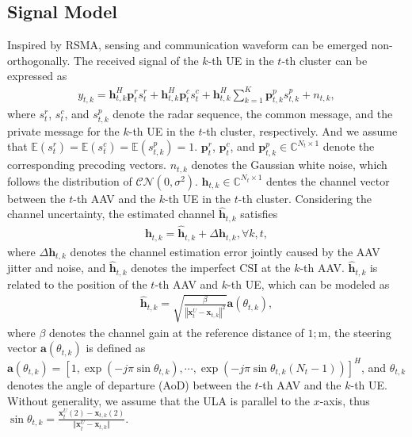 \documentclass[twocolumn,journal]{IEEEtran}
\begin{document}
\subsection{Signal Model}
Inspired by RSMA, sensing and communication waveform can be emerged non-orthogonally. The received signal of the \(k\)-th UE in the \(t\)-th cluster can be expressed as 
\begin{align}
    y_{t,k} = \boldsymbol{h}^{H}_{t,k}\boldsymbol{p}^{r}_{t} {s}^{r}_{t} + \boldsymbol{h}^{H}_{t,k}\boldsymbol{p}^{c}_{t}{s}^{c}_{t} + \boldsymbol{h}^{H}_{t,k}\sum_{k=1}^{K} \boldsymbol{p}^{p}_{t,k} {s}^{p}_{t,k} + n_{t,k},
\end{align}
where \(s^{r}_{t}\), \(s_{t}^{c}\), and \(s^{p}_{t,k}\) denote the radar sequence, the common message, and the private message for the \(k\)-th UE in the \(t\)-th cluster, respectively. And we assume that \(\mathbb{E}(s^{r}_{t})=\mathbb{E}(s_{t}^{c})=\mathbb{E}(s^{p}_{t,k})=1\). \(\boldsymbol{p}^{r}_{t}\), \(\boldsymbol{p}^{c}_{t}\), and \(\boldsymbol{p}^{p}_{t,k}\in\mathbb{C}^{N_t\times 1}\) denote the corresponding precoding vectors. \(n_{t,k}\) denotes the Gaussian white noise, which follows the distribution of \(\mathcal{CN}(0,\sigma^2)\). \(\boldsymbol{h}_{t,k}\in\mathbb{C}^{N_t \times 1}\) dentes the channel vector between the \(t\)-th AAV and the \(k\)-th UE in the \(t\)-th cluster. Considering the channel uncertainty, the estimated channel \(\hat{\boldsymbol{h}}_{t,k}\) satisfies 
\begin{align}
    \boldsymbol{h}_{t,k} = \hat{\boldsymbol{h}}_{t,k} + \Delta\boldsymbol{h}_{t,k}, \forall k,t,\label{eq:commChannelUncertainty}
\end{align} 
where \(\Delta\boldsymbol{h}_{t,k}\) denotes the channel estimation error jointly caused by the AAV jitter and noise, and \(\hat{\boldsymbol{h}}_{t,k}\) denotes the imperfect CSI at the \(k\)-th AAV. \(\hat{\boldsymbol{h}}_{t,k}\) is related to the position of the \(t\)-th AAV and \(k\)-th UE, which can be modeled as \cite{linMultiAntenna2024}
\begin{align}
    \hat{\boldsymbol{h}}_{t,k} = \sqrt{\frac{\beta}{\left\Vert \boldsymbol{x}^{U}_{t} - \boldsymbol{x}_{t,k} \right\Vert^2}}\boldsymbol{a}(\theta_{t,k}),
\end{align}
where \(\beta\) denotes the channel gain at the reference distance of \(1;\text{m}\), the steering vector \(\boldsymbol{a}(\theta_{t,k})\) is defined as \(\boldsymbol{a}(\theta_{t,k})=[1,\exp(-j\pi\sin\theta_{t,k}),\cdots,\exp(-j\pi\sin\theta_{t,k}(N_t-1))]^H\), and \(\theta_{t,k}\) denotes the angle of departure (AoD) between the \(t\)-th AAV and the \(k\)-th UE. Without generality, we assume that the ULA is parallel to the \(x\)-axis, thus \(\sin\theta_{t,k} = \frac{\boldsymbol{x}^{U}_{t}(2) - \boldsymbol{x}_{t,k}(2)}{\Vert \boldsymbol{x}^{U}_{t} - \boldsymbol{x}_{t,k}\Vert}\).
\end{document}
